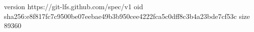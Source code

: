 version https://git-lfs.github.com/spec/v1
oid sha256:e8f817fc7c9500be07eebae49b3b950cee4222fca5c0dff8c3b4a23bde7cf53c
size 89360
